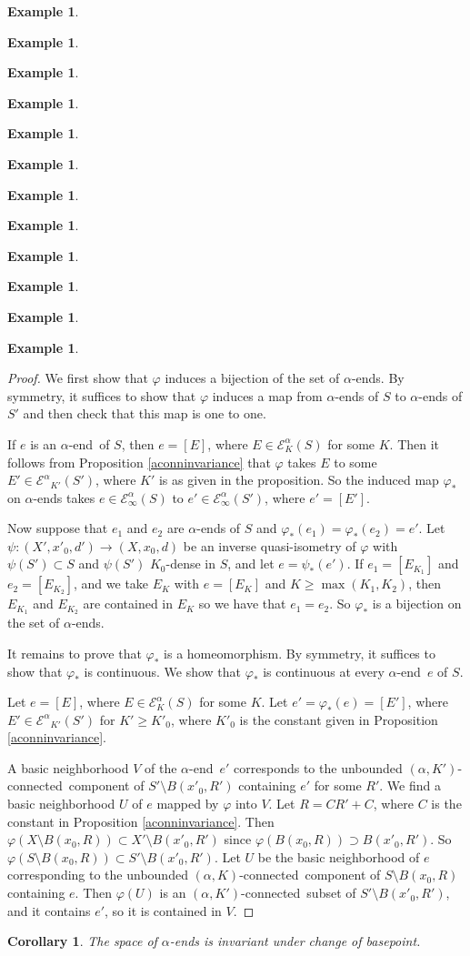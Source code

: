 \documentclass[12pt]{amsart}
\newtheorem{corollary}[theorem]{Corollary}
\theoremstyle{definition}
\newtheorem{example}[theorem]{Example}
\theoremstyle{remark}
\numberwithin{equation}{section}
\newcommand{\ph}{\varphi}
\newcommand{\akconn}{$(\alpha,K)$-connected}
\newcommand{\akpconn}{$(\alpha,K')$-connected}
\newcommand{\aend}{$\alpha$-end}
\newcommand{\calek}{{\mathcal E}^\alpha_K}
\newcommand{\calekp}{{\mathcal E^\alpha}_{K'}}
\newcommand{\caleinf}{{\mathcal E}^\alpha_\infty}
\begin{document}
\begin{example}
\begin{example}
\begin{example}
\begin{example}
\begin{example}
\begin{example}
\begin{example}
\begin{example}
\begin{example}
\begin{example}
\begin{example}
\begin{example}
\begin{proof}
We first show that $\ph$ induces a bijection of the set of \aend s. By
symmetry, it suffices to show that $\ph$ induces a map from \aend s of
$S$ to \aend s of $S'$ and then check that this map is one to one.

If $e$ is an \aend \ of $S$, then $e=[E]$, where $E \in \calek(S)$ for
some $K$. Then it follows from Proposition \ref{aconninvariance} that
$\ph$ takes $E$ to some $E' \in \calekp(S')$, where $K'$ is as given
in the proposition. So the induced map $\ph_*$ on \aend s takes $e \in
\caleinf(S)$ to $e' \in \caleinf(S')$, where $e' = [E']$.

Now suppose that $e_1$ and $e_2$ are \aend s of $S$ and
$\ph_*(e_1)=\ph_*(e_2)=e'$. Let $\psi: (X',x'_0,d') \to (X,x_0,d)$ be
an inverse quasi-isometry of $\ph$ with $\psi(S') \subset S$ and
$\psi(S')$ $K_0$-dense in $S$, and let $e= \psi_*(e')$. If $e_1 =
[E_{K_1}]$ and $e_2 = [E_{K_2}]$, and we take $E_K$ with $e = [E_K]$
and $K \geq \max(K_1,K_2)$, then $E_{K_1}$ and $E_{K_2}$ are contained
in $E_K$ so we have that $e_1 = e_2$. So $\ph_*$ is a bijection on the
set of \aend s.

It remains to prove that $\ph_*$ is a homeomorphism. By symmetry, it
suffices to show that $\ph_*$ is continuous. We show that $\ph_*$ is
continuous at every \aend \ $e$ of $S$.

Let $e=[E]$, where $E \in \calek(S)$ for some $K$. Let $e'=\ph_*(e)
=[E']$, where $E' \in \calekp(S')$ for $K' \geq K'_0$, where $K'_0$ is
the constant given in Proposition \ref{aconninvariance}.

A basic neighborhood $V$ of the \aend\ $e'$ corresponds to the
unbounded \akpconn\ component of $S' \setminus B(x'_0, R')$ containing
$e'$ for some $R'$. We find a basic neighborhood $U$ of $e$ mapped by
$\ph$ into $V$. Let $R=CR'+C$, where $C$ is the constant in
Proposition \ref{aconninvariance}. Then $\ph(X \setminus B(x_0, R))
\subset X' \setminus B(x'_0, R')$ since $\ph(B(x_0, R)) \supset
B(x'_0, R')$. So $\ph(S \setminus B(x_0, R)) \subset S' \setminus
B(x'_0, R')$. Let $U$ be the basic neighborhood of $e$ corresponding
to the unbounded \akconn\ component of $S \setminus B(x_0, R)$
containing $e$. Then $\ph(U)$ is an \akpconn\ subset of $S' \setminus
B(x'_0, R')$, and it contains $e'$, so it is contained in $V$.
\end{proof}

\begin{corollary}
The space of \aend s is invariant under change of basepoint.
\end{corollary}


\end{example}
\end{example}
\end{example}
\end{example}
\end{example}
\end{example}
\end{example}
\end{example}
\end{example}
\end{example}
\end{example}
\end{example}
\end{document}
